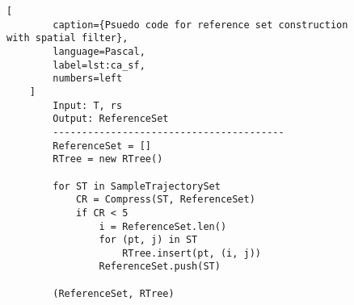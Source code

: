 \begin{figure}
    \begin{lstlisting}[
        caption={Psuedo code for reference set construction with spatial filter},
        language=Pascal,
        label=lst:ca_sf,
        numbers=left
    ]
        Input: T, rs
        Output: ReferenceSet
        ----------------------------------------
        ReferenceSet = []
        RTree = new RTree()

        for ST in SampleTrajectorySet
            CR = Compress(ST, ReferenceSet)
            if CR < 5 
                i = ReferenceSet.len()
                for (pt, j) in ST
                    RTree.insert(pt, (i, j))
                ReferenceSet.push(ST)

        (ReferenceSet, RTree)
    \end{lstlisting}
\end{figure}